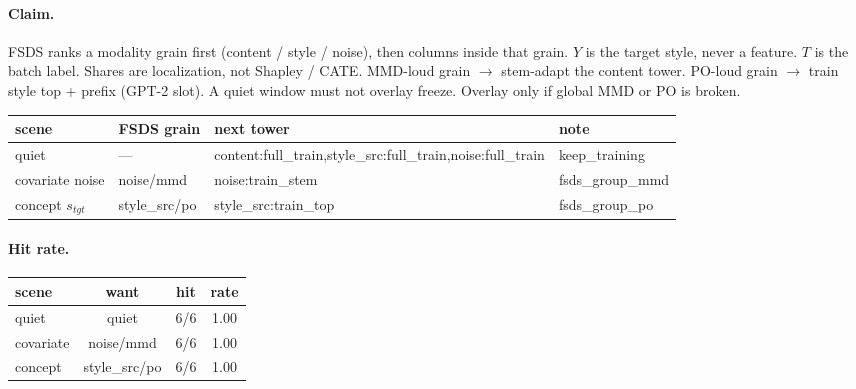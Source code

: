 \documentclass[11pt]{article}
\begin{document}
\paragraph{Claim.}
FSDS ranks a modality grain first (content / style / noise),
then columns inside that grain. $Y$ is the target style, never a feature.
$T$ is the batch label. Shares are localization, not Shapley / CATE.
MMD-loud grain $\to$ stem-adapt the content tower.
PO-loud grain $\to$ train style top + prefix (GPT-2 slot).
A quiet window must not overlay freeze. Overlay only if global MMD or PO is broken.
\vspace{0.8em}
\begin{tabular}{@{}llll@{}}
\toprule
scene & FSDS grain & next tower & note \\
\midrule
quiet & --- & content:full_train,style_src:full_train,noise:full_train & keep_training \\
covariate noise & noise/mmd & noise:train_stem & fsds_group_mmd \\
concept $s_{tgt}$ & style_src/po & style_src:train_top & fsds_group_po \\
\bottomrule
\end{tabular}
\vspace{1.2em}
\paragraph{Hit rate.}
\begin{tabular}{@{}lccc@{}}
\toprule
scene & want & hit & rate \\
\midrule
quiet & quiet & 6/6 & 1.00 \\
covariate & noise/mmd & 6/6 & 1.00 \\
concept & style_src/po & 6/6 & 1.00 \\
\bottomrule
\end{tabular}
\end{document}
